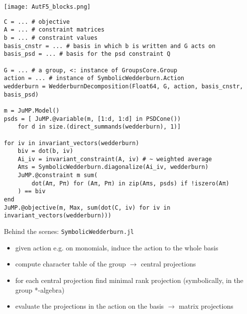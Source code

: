 \begin{frame}
\begin{center}
\vfill
\texttt{[image: AutF5\_blocks.png]}
\vfill
\end{center}
\end{frame}

\begin{frame}
\centering
{}


\end{frame}



\begin{frame}[fragile]
\scriptsize
\begin{verbatim}
C = ... # objective
A = ... # constraint matrices
b = ... # constraint values
basis_cnstr = ... # basis in which b is written and G acts on
basis_psd = ... # basis for the psd constraint Q

G = ... # a group, <: instance of GroupsCore.Group
action = ... # instance of SymbolicWedderburn.Action
wedderburn = WedderburnDecomposition(Float64, G, action, basis_cnstr, basis_psd)

m = JuMP.Model()
psds = [ JuMP.@variable(m, [1:d, 1:d] in PSDCone())
    for d in size.(direct_summands(wedderburn), 1)]

for iv in invariant_vectors(wedderburn)
    biv = dot(b, iv)
    Ai_iv = invariant_constraint(A, iv) # ~ weighted average
    Aπs = SymbolicWedderburn.diagonalize(Ai_iv, wedderburn)
    JuMP.@constraint m sum(
        dot(Aπ, Pπ) for (Aπ, Pπ) in zip(Aπs, psds) if !iszero(Aπ)
    ) == biv
end
JuMP.@objective(m, Max, sum(dot(C, iv) for iv in invariant_vectors(wedderburn)))

\end{verbatim}

\end{frame}


\begin{frame}{Behind the scenes: \texttt{SymbolicWedderburn.jl}}
    \begin{itemize}
      \item given action e.g. on monomials, \alert{induce} the action to the whole basis
      \item compute \alert{character table} of the group $\longrightarrow$ central projections
      \item for each central projection find minimal rank projection (symbolically, in the group *-algebra)
      \item evaluate the projections in the action on the basis $\longrightarrow$ \alert{matrix projections}
    \end{itemize}
\end{frame}


